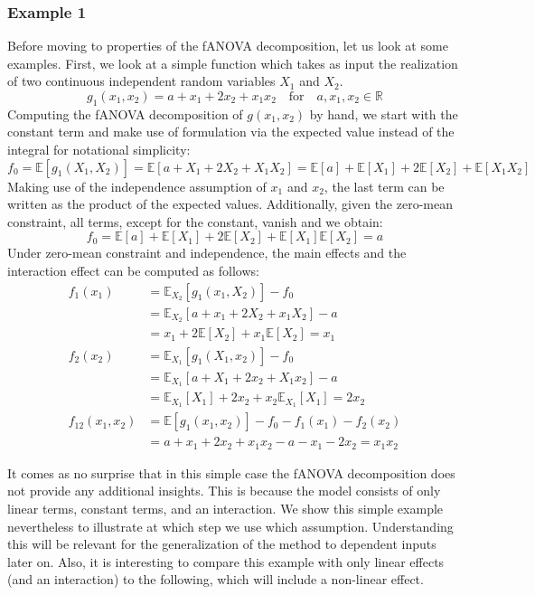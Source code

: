 \subsubsection*{Example 1}
Before moving to properties of the fANOVA decomposition, let us look at some examples.
First, we look at a simple function which takes as input the realization of two continuous independent random variables $X_1$ and $X_2$.
\[
g_{1}(x_1, x_2) = a + x_1 + 2x_2 + x_1x_2 \quad \text{for} \quad a, x_1, x_2 \in \mathbb{R}
\]
Computing the fANOVA decomposition of $g(x_1, x_2)$ by hand, we start with the constant term and make use of formulation via the expected value instead of the integral for notational simplicity:
\[
f_0 = \mathbb{E}[g_{1}(X_1, X_2)] = \mathbb{E}[a + X_1 + 2X_2 + X_1X_2] = \mathbb{E}[a] + \mathbb{E}[X_1] + 2\mathbb{E}[X_2] + \mathbb{E}[X_1X_2]
\]
Making use of the independence assumption of $x_1$ and $x_2$, the last term can be written as the product of the expected values. Additionally, given the zero-mean constraint, all terms, except for the constant, vanish and we obtain:
\[
f_0 = \mathbb{E}[a] + \mathbb{E}[X_1] + 2\mathbb{E}[X_2] + \mathbb{E}[X_1]\mathbb{E}[X_2] = a
\]
Under zero-mean constraint and independence, the main effects and the interaction effect can be computed as follows:
\begin{align*}
f_1(x_1) &= \mathbb{E}_{X_2}[g_{1}(x_1, X_2)] - f_0 \\
&= \mathbb{E}_{X_2}[a + x_1 + 2X_2 + x_1X_2] - a \\
&= x_1 + 2\mathbb{E}[X_2] + x_1\mathbb{E}[X_2] = x_1\\
f_2(x_2) &= \mathbb{E}_{X_1}[g_{1}(X_1, x_2)] - f_0 \\
&= \mathbb{E}_{X_1}[a + X_1 + 2x_2 + X_1x_2] - a \\
&= \mathbb{E}_{X_1}[X_1] + 2x_2 + x_2\mathbb{E}_{X_1}[X_1] = 2x_2\\
f_{12}(x_1, x_2) &= \mathbb{E}[g_{1}(x_1, x_2)] - f_0 - f_1(x_1) - f_2(x_2) \\
&= a + x_1 + 2x_2 + x_1x_2 - a - x_1 - 2x_2 = x_1x_2
\end{align*}

It comes as no surprise that in this simple case the fANOVA decomposition does not provide any additional insights. This is because the model consists of only linear terms, constant terms, and an interaction. We show this simple example nevertheless to illustrate at which step we use which assumption. Understanding this will be relevant for the generalization of the method to dependent inputs later on. Also, it is interesting to compare this example with only linear effects (and an interaction) to the following, which will include a non-linear effect.\par
